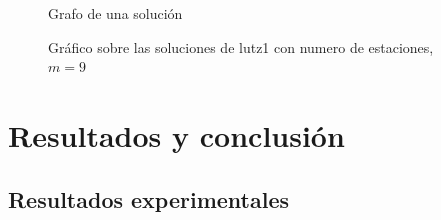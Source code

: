 \documentclass[12pt,a4paper]{report}
\begin{document}
        \begin{figure}[H]
        \centering
        \begin{minipage}{0.48\textwidth}
        \centering
        \caption{Grafo de una solución}
        \label{fig:figura1}
        \end{minipage}\hfill
        \begin{minipage}{0.48\textwidth}
            \centering
            \caption{Gráfico sobre las soluciones de lutz1 con numero de estaciones, $m=9$}
            \label{fig:figura2}
        \end{minipage}
    \end{figure}
    \chapter{Resultados y conclusión}
    \section{Resultados experimentales}
\end{document}
